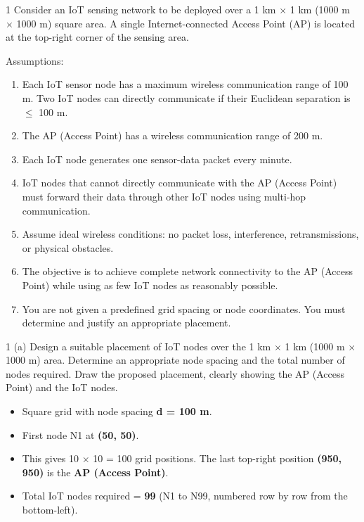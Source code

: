 
\begin{question}{1}
Consider an IoT sensing network to be deployed over a 1 km $\times$ 1 km (1000 m $\times$ 1000 m)
square area. A single Internet-connected Access Point (AP) is located at the top-right corner of the sensing area.

Assumptions:
\begin{enumerate}[label=\arabic*.]
\item Each IoT sensor node has a maximum wireless communication range of 100 m. Two IoT nodes can directly communicate if their Euclidean separation is $\leq$ 100 m.
\item The AP (Access Point) has a wireless communication range of 200 m.
\item Each IoT node generates one sensor-data packet every minute.
\item IoT nodes that cannot directly communicate with the AP (Access Point) must forward their
data through other IoT nodes using multi-hop communication.
\item Assume ideal wireless conditions: no packet loss, interference, retransmissions, or physical obstacles.
\item The objective is to achieve complete network connectivity to the AP (Access Point) while using as few IoT nodes as reasonably possible.
\item You are not given a predefined grid spacing or node coordinates. You must determine and justify an appropriate
placement.
\end{enumerate}
\end{question}

\begin{question}{1 (a)}
Design a suitable placement of IoT nodes over the 1 km $\times$ 1 km (1000 m $\times$ 1000 m)
area. Determine an appropriate node spacing and the total number of nodes required. Draw the proposed placement,
clearly showing the AP (Access Point) and the IoT nodes.
\end{question}

\begin{itemize}
\item Square grid with node spacing \textbf{d = 100 m}.
\item First node N1 at \textbf{(50, 50)}.
\item This gives 10 $\times$ 10 = 100 grid positions. The last top-right position \textbf{(950, 950)} is the
\textbf{AP (Access Point)}.
\item Total IoT nodes required = \textbf{99} (N1 to N99, numbered row by row from the
bottom-left).
\end{itemize}

